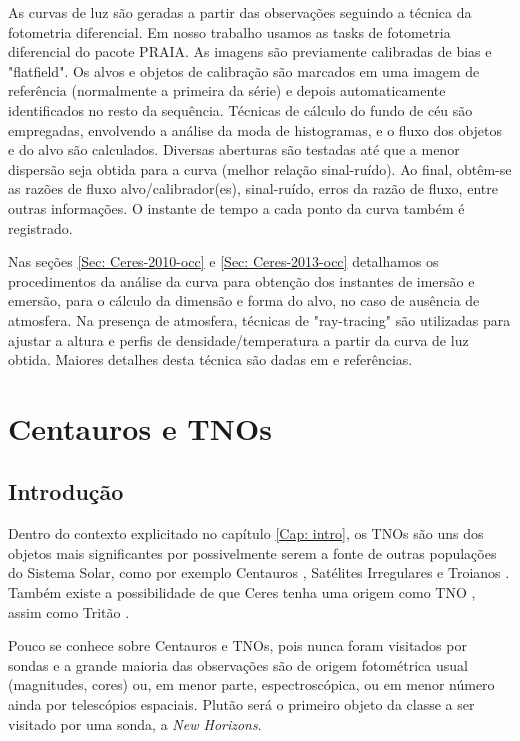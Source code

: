 \documentclass[12pt,a4paper]{monografia}
\begin{document}
As curvas de luz são geradas a partir das observações seguindo a técnica da fotometria diferencial. Em nosso trabalho usamos as tasks de fotometria diferencial do pacote PRAIA. As imagens são previamente calibradas de bias e "flatfield". Os alvos e objetos de calibração são marcados em uma imagem de referência (normalmente a primeira da série) e depois automaticamente identificados no resto da sequência. Técnicas de cálculo do fundo de céu são empregadas, envolvendo a análise da moda de histogramas, e o fluxo dos objetos e do alvo são calculados. Diversas aberturas são testadas até que a menor dispersão seja obtida para a curva (melhor relação sinal-ruído). Ao final, obtêm-se as razões de fluxo alvo/calibrador(es), sinal-ruído, erros da razão de fluxo, entre outras informações. O instante de tempo a cada ponto da curva também é registrado.

Nas seções \ref{Sec: Ceres-2010-occ} e \ref{Sec: Ceres-2013-occ} detalhamos os procedimentos da análise da curva para obtenção dos instantes de imersão e emersão, para o cálculo da dimensão e forma do alvo, no caso de ausência de atmosfera. Na presença de atmosfera, técnicas de "ray-tracing" são utilizadas para ajustar a altura e perfis de densidade/temperatura a partir da curva de luz obtida. Maiores detalhes desta técnica são dadas em \cite{DiasOliveira2015} e referências. 

\chapter{Centauros e TNOs}
\label{Cap: TNOs}

\section{Introdução}
\label{Sec: TNOs-intro}

\indent \indent Dentro do contexto explicitado no capítulo \ref{Cap: intro}, os TNOs são uns dos objetos mais significantes por possivelmente serem a fonte de outras populações do Sistema Solar, como por exemplo Centauros \citep{Fernandez2002}, Satélites Irregulares \citep{Nesvorny2007} e Troianos \citep{Morbidelli2005}. Também existe a possibilidade de que Ceres tenha uma origem como TNO \citep{McKinnon2012}, assim como Tritão \citep{Agnor2006}.

Pouco se conhece sobre Centauros e TNOs, pois nunca foram visitados por sondas e a grande maioria das observações são de origem fotométrica usual (magnitudes, cores) ou, em menor parte, espectroscópica, ou em menor número ainda por telescópios espaciais. Plutão será o primeiro objeto da classe a ser visitado por uma sonda, a \textit{New Horizons}.
\end{document}
